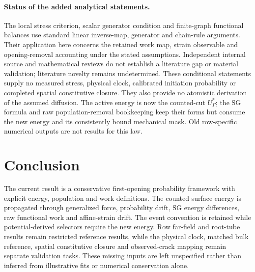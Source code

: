 \documentclass[11pt]{article}
\begin{document}
\paragraph{Status of the added analytical statements.}
The local stress criterion, scalar generator condition and finite-graph
functional balances use standard linear inverse-map, generator and
chain-rule arguments. Their application here concerns the retained work map,
strain observable and opening-removal accounting under the stated
assumptions. Independent internal source and mathematical reviews do not
establish a literature gap or material validation; literature novelty remains
undetermined. These conditional statements supply no measured stress,
physical clock, calibrated initiation probability or completed spatial
constitutive closure. They also provide no atomistic derivation of the
assumed diffusion. The active energy is now the counted-cut $U_\Gamma^*$;
the SG formula and raw population-removal bookkeeping keep their forms
but consume the new energy and its consistently bound mechanical mask.
Old row-specific numerical outputs are not results for this law.

\section{Conclusion}
The current result is a conservative first-opening probability framework with
explicit energy, population and work definitions. The counted surface
energy is propagated through generalized force, probability drift, SG
energy differences, raw functional work and affine-strain drift. The event
convention is retained while potential-derived selectors require the new
energy. Row far-field and root-tube results remain restricted reference
results, while the physical clock, matched bulk
reference, spatial constitutive closure and observed-crack mapping remain
separate validation tasks. These missing inputs are left unspecified rather
than inferred from illustrative fits or numerical conservation alone.



\end{document}
